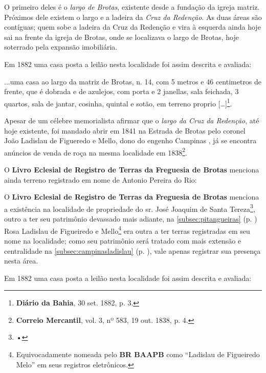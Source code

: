 \begin{citacao}
O primeiro deles é o \textit{largo de Brotas}, existente desde a fundação da igreja matriz. Próximos dele existem o largo e a ladeira da \textit{Cruz da Redenção}. As duas áreas são contíguas; quem sobe a ladeira da Cruz da Redenção e vira à esquerda ainda hoje sai na frente da igreja de Brotas, onde se localizava o largo de Brotas, hoje soterrado pela expansão imobiliária.

Em 1882 uma casa posta a leilão nesta localidade foi assim descrita e avaliada:

\begin{citacao}
...uma casa ao largo da matriz de Brotas, n. 14, com 5 metros e 46 centimetros de frente, que é dobrada e de azulejos, com porta e 2 janellas, sala feichada, 3 quartos, sala de jantar, cosinha, quintal e sotão, em terreno proprio [\dots]\footnote{\textbf{Diário da Bahia}, 30 set. 1882, p. 3.}.
\end{citacao}

Apesar de um célebre memorialista afirmar que o \textit{largo da Cruz da Redenção}, até hoje existente, foi mandado abrir em 1841 na Estrada de Brotas pelo coronel João Ladislau de Figueredo e Mello, dono do engenho Campinas \cite[p.~88]{campos_brotas_1942}, já se encontra anúncios de venda de roça na mesma localidade em 1838\footnote{\textbf{Correio Mercantil}, vol. 3, nº 583, 19 out. 1838, p. 4.}.





O \textbf{Livro Eclesial de Registro de Terras da Freguesia de Brotas} menciona ainda terreno registrado em nome de Antonio Pereira do Rio:



O \textbf{Livro Eclesial de Registro de Terras da Freguesia de Brotas} menciona a existência na localidade de propriedade do sr. José Joaquim de Santa Tereza\footnote{•}, outro a ter seu patrimônio devassado mais adiante, na \autoref{subsec:pitangueiras} (p. \pageref{subsec:pitangueiras}) Rosa Ladislau de Figueiredo e Mello\footnote{Equivocadamente nomeada pelo \textbf{BR BAAPB} como ``Ladislau de Figueiredo Melo'' em seus registros eletrônicos.} era outra a ter terras registradas em seu nome na localidade; como seu patrimônio será tratado com mais extensão e centralidade na \autoref{subsec:campinasladislau} (p. \pageref{subsec:campinasladislau}), vale apenas registrar sua presença nesta área.




Em 1882 uma casa posta a leilão nesta localidade foi assim descrita e avaliada:


\end{citacao}
